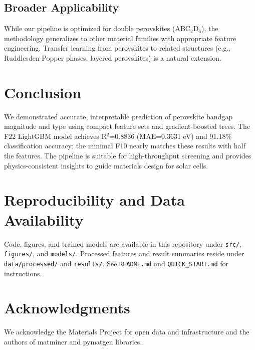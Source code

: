 \documentclass[conference]{IEEEtran}
\begin{document}
\subsection{Broader Applicability}
While our pipeline is optimized for double perovskites (ABC$_2$D$_6$), the methodology generalizes to other material families with appropriate feature engineering. Transfer learning from perovskites to related structures (e.g., Ruddlesden-Popper phases, layered perovskites) is a natural extension.

\section{Conclusion}
We demonstrated accurate, interpretable prediction of perovskite bandgap magnitude and type using compact feature sets and gradient-boosted trees. The F22 LightGBM model achieves R$^2$=0.8836 (MAE=0.3631 eV) and 91.18\% classification accuracy; the minimal F10 nearly matches these results with half the features. The pipeline is suitable for high-throughput screening and provides physics-consistent insights to guide materials design for solar cells.

\section*{Reproducibility and Data Availability}
Code, figures, and trained models are available in this repository under \texttt{src/}, \texttt{figures/}, and \texttt{models/}. Processed features and result summaries reside under \texttt{data/processed/} and \texttt{results/}. See \texttt{README.md} and \texttt{QUICK\_START.md} for instructions.

\section*{Acknowledgments}
We acknowledge the Materials Project for open data and infrastructure and the authors of matminer and pymatgen libraries.
\end{document}
